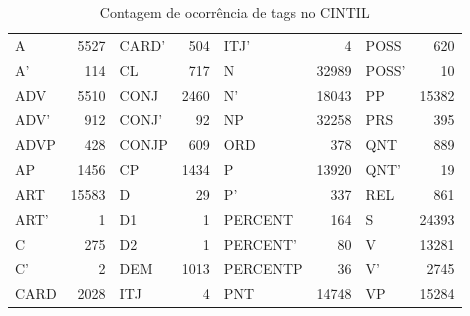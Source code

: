 \begin{table}[]
    \centering
    \begin{tabular}{|l|r|l|r|l|r|l|r|}
    \hline
        A& 5527& CARD'& 504& ITJ'& 4& POSS& 620\\
        A'& 114& CL& 717& N& 32989& POSS'& 10\\
        ADV& 5510& CONJ& 2460& N'& 18043& PP& 15382\\
        ADV'& 912& CONJ'& 92& NP& 32258& PRS& 395\\
        ADVP& 428& CONJP& 609& ORD& 378& QNT& 889\\
        AP& 1456& CP& 1434& P& 13920& QNT'& 19\\
        ART& 15583& D& 29& P'& 337& REL& 861\\
        ART'& 1& D1& 1& PERCENT& 164& S& 24393\\
        C& 275& D2& 1& PERCENT'& 80& V& 13281\\
        C'& 2& DEM& 1013& PERCENTP& 36& V'& 2745\\
        CARD& 2028& ITJ& 4& PNT& 14748& VP& 15284\\
    \hline
    \end{tabular}
    \caption{Contagem de ocorrência de tags no CINTIL}
    \label{tab:tab_occ_cintil}
\end{table}